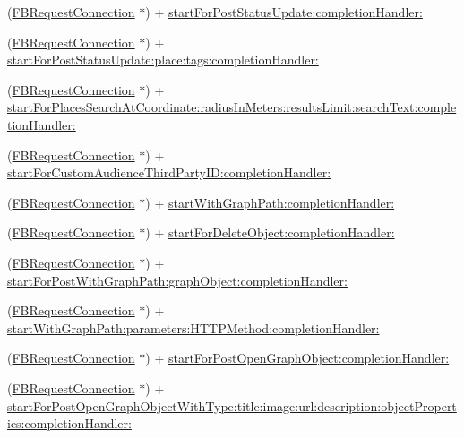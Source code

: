 \begin{DoxyCompactItemize}
\item 
(\hyperlink{interfaceFBRequestConnection}{F\+B\+Request\+Connection} $\ast$) + \hyperlink{interfaceFBRequestConnection_a0dee12879e90db0c29e15916375c73b0}{start\+For\+Post\+Status\+Update\+:completion\+Handler\+:}
\item 
(\hyperlink{interfaceFBRequestConnection}{F\+B\+Request\+Connection} $\ast$) + \hyperlink{interfaceFBRequestConnection_a98c2c8abc0efadda28f1c21ec0878a05}{start\+For\+Post\+Status\+Update\+:place\+:tags\+:completion\+Handler\+:}
\item 
(\hyperlink{interfaceFBRequestConnection}{F\+B\+Request\+Connection} $\ast$) + \hyperlink{interfaceFBRequestConnection_abc6f5878bcfabf0b419347a4cbfb2f68}{start\+For\+Places\+Search\+At\+Coordinate\+:radius\+In\+Meters\+:results\+Limit\+:search\+Text\+:completion\+Handler\+:}
\item 
(\hyperlink{interfaceFBRequestConnection}{F\+B\+Request\+Connection} $\ast$) + \hyperlink{interfaceFBRequestConnection_ab2ed1b7d417b4c723b37512870a5add9}{start\+For\+Custom\+Audience\+Third\+Party\+I\+D\+:completion\+Handler\+:}
\item 
(\hyperlink{interfaceFBRequestConnection}{F\+B\+Request\+Connection} $\ast$) + \hyperlink{interfaceFBRequestConnection_ad5b57e64c614dcb04a71e62ee11a87d5}{start\+With\+Graph\+Path\+:completion\+Handler\+:}
\item 
(\hyperlink{interfaceFBRequestConnection}{F\+B\+Request\+Connection} $\ast$) + \hyperlink{interfaceFBRequestConnection_a3fc3ae420d8e47fd0b7a6b915622c527}{start\+For\+Delete\+Object\+:completion\+Handler\+:}
\item 
(\hyperlink{interfaceFBRequestConnection}{F\+B\+Request\+Connection} $\ast$) + \hyperlink{interfaceFBRequestConnection_ac79fe3711cf5a9dd8a9dde04638ca255}{start\+For\+Post\+With\+Graph\+Path\+:graph\+Object\+:completion\+Handler\+:}
\item 
(\hyperlink{interfaceFBRequestConnection}{F\+B\+Request\+Connection} $\ast$) + \hyperlink{interfaceFBRequestConnection_aff0e9852584fcd2c81eb7f4751ef0ee2}{start\+With\+Graph\+Path\+:parameters\+:\+H\+T\+T\+P\+Method\+:completion\+Handler\+:}
\item 
(\hyperlink{interfaceFBRequestConnection}{F\+B\+Request\+Connection} $\ast$) + \hyperlink{interfaceFBRequestConnection_aa592bef80bf5a2450be91fc9538b65bd}{start\+For\+Post\+Open\+Graph\+Object\+:completion\+Handler\+:}
\item 
(\hyperlink{interfaceFBRequestConnection}{F\+B\+Request\+Connection} $\ast$) + \hyperlink{interfaceFBRequestConnection_a98c88d095d77cc16d000fb9ce51d39e1}{start\+For\+Post\+Open\+Graph\+Object\+With\+Type\+:title\+:image\+:url\+:description\+:object\+Properties\+:completion\+Handler\+:}

\end{DoxyCompactItemize}
